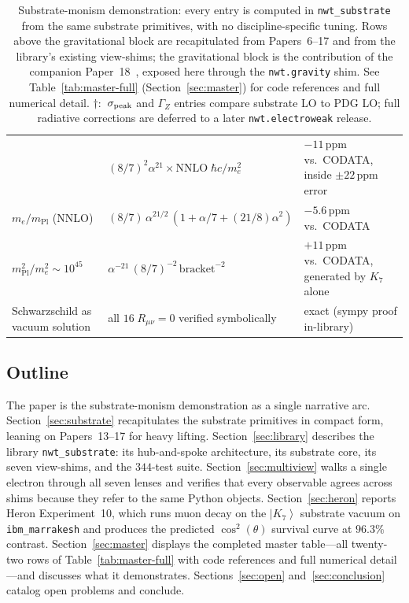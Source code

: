 \documentclass[11pt]{article}
\newcommand{\ket}[1]{\left|#1\right\rangle}
\newcommand{\mPl}{m_{\mathrm{Pl}}}
\newcommand{\me}{m_e}
\newcommand{\nwtsub}{\texttt{nwt\_substrate}}
\begin{document}
\begin{table}[H]
\begin{tabular}{p{4.0cm}p{5.0cm}p{4.5cm}}
  & $(8/7)^2 \alpha^{21} \times \mathrm{NNLO}\;\hbar c/\me^2$
  & $-11$\,ppm vs.\ CODATA, inside $\pm 22$\,ppm error \\
$\me/\mPl$ (NNLO)
  & $(8/7)\,\alpha^{21/2}\,(1+\alpha/7+(21/8)\alpha^2)$
  & $-5.6$\,ppm vs.\ CODATA \\
$\mPl^2/\me^2 \sim 10^{45}$
  & $\alpha^{-21}\,(8/7)^{-2}\,\mathrm{bracket}^{-2}$
  & $+11$\,ppm vs.\ CODATA, generated by $K_7$ alone \\
Schwarzschild as vacuum solution
  & all $16\;R_{\mu\nu} = 0$ verified symbolically
  & exact (sympy proof in-library) \\
\bottomrule
\end{tabular}
\caption{Substrate-monism demonstration: every entry is computed
in \nwtsub{} from the same substrate primitives, with no
discipline-specific tuning.  Rows above the gravitational block
are recapitulated from Papers~6--17 and from the library's
existing view-shims; the gravitational block is the contribution
of the companion Paper~18~\cite{paper18}, exposed here through the
\texttt{nwt.gravity} shim.  See Table~\ref{tab:master-full}
(Section~\ref{sec:master}) for code references and full numerical
detail.  $\dag$:\ $\sigma_{\rm peak}$ and $\Gamma_Z$ entries
compare substrate LO to PDG LO; full radiative corrections
are deferred to a later \texttt{nwt.electroweak} release.}
\label{tab:master-preview}
\end{table}

\subsection{Outline}

The paper is the substrate-monism demonstration as a single
narrative arc.  Section~\ref{sec:substrate} recapitulates the
substrate primitives in compact form, leaning on Papers~13--17
for heavy lifting.  Section~\ref{sec:library} describes the
library \nwtsub{}: its hub-and-spoke architecture, its substrate
core, its seven view-shims, and the $344$-test suite.
Section~\ref{sec:multiview} walks a single electron through all
seven lenses and verifies that every observable agrees across
shims because they refer to the same Python objects.
Section~\ref{sec:heron} reports Heron Experiment~10, which runs
muon decay on the $\ket{K_7}$ substrate vacuum on
\texttt{ibm\_marrakesh} and produces the predicted
$\cos^2(\theta)$ survival curve at $96.3\%$ contrast.
Section~\ref{sec:master} displays the completed master
table---all twenty-two rows of Table~\ref{tab:master-full} with
code references and full numerical detail---and discusses what it
demonstrates.  Sections~\ref{sec:open} and~\ref{sec:conclusion}
catalog open problems and conclude.
\end{document}
